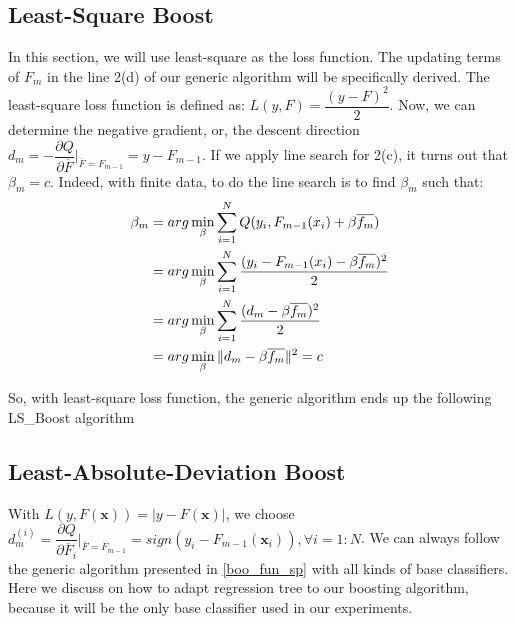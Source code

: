 \documentclass[a4paper,twoside,12pt]{article}
\begin{document}
\subsection{Least-Square Boost}
In this section, we will use least-square as the loss function. The updating terms of $F_m$ in the line 2(d) of our generic algorithm will be specifically derived. The least-square loss function is defined as: $L(y, F) = \dfrac{(y-F)^2}{2}$. Now, we can determine the negative gradient, or, the descent direction $d_m = -\dfrac{\partial{Q}}{\partial{\overline{F}}}\vert_{\overline{F} = F_{m-1}} = y - F_{m-1}$. If we apply line search for 2(c), it turns out that $\beta_m = c$. Indeed, with finite data, to do the line search is to find $\beta_m$ such that:
\begin{align}
	\beta_m  &= arg\min\limits_{\beta}\sum_{i=1}^{N}{Q(y_i, F_{m-1}(x_i) + \beta\overline{f_m})} \notag \\
	&= arg\min\limits_{\beta}\sum_{i=1}^{N}{\dfrac{(y_i - F_{m-1}(x_i) - \beta\overline{f_m})^2}{2}}\notag \\
	&= arg\min\limits_{\beta}\sum_{i=1}^{N}{\dfrac{(d_m - \beta\overline{f_m})^2}{2}}\notag \\
	&= arg\min\limits_{\beta}\| d_m - \beta\overline{f_m}\|^2 = c\notag
\end{align}

So, with least-square loss function, the generic algorithm ends up the following LS\_Boost algorithm

\begin{center}
\end{center}


\subsection{Least-Absolute-Deviation Boost}
\label{LAD}
\label{sec:LAD_treeboost}
With $L(y, F(\textbf{x})) = \vert y - F(\textbf{x})\vert$, we choose $d_m^{(i)} = \dfrac{\partial Q}{\partial \overline{F}_i}\vert_{\overline{F} = \overline{F}_{m-1}} = sign(y_i - F_{m-1}(\textbf{x}_i)), \forall i = 1:N$. We can always follow the generic algorithm presented in \ref{boo_fun_sp} with all kinds of base classifiers. Here we discuss on how to adapt regression tree to our boosting algorithm, because it will be the only base classifier used in our experiments.
\end{document}
